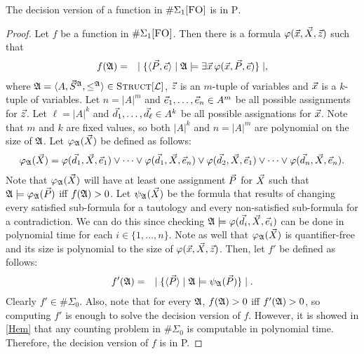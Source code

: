 \begin{theo} \label{decisionptime}
The decision version of a function in $\E1$ is in \textsc{P}.
\end{theo}
\begin{proof}
Let $f$ be a function in $\E1$. Then there is a formula $\varphi(\x,\X,\z)$ such that
\begin{eqnarray*}
f(\A) &=& \mid \{ \langle\P,\e\rangle \mid \A \models \exists \x \, \varphi(\x,\P,\e) \} \mid,
\end{eqnarray*}
where $\A = \langle A, \S^{\A}, \leq^{\A} \rangle \in \Truc$, $\z$ is an $m$-tuple of variables and $\x$ is a $k$-tuple of variables. Let $n = \vert A \vert^m$ and $\e_1,\dots,\e_n \in A^m$ be all possible assignments for $\z$. Let $\ell = \vert A \vert^k$ and $\d_1,\dots,\d_\ell\in A^k$ be all possible assignations for $\x$. Note that $m$ and $k$ are fixed values, so both $\vert A \vert^k$ and $n=\vert A \vert^m$ are polynomial on the size of $\A$. Let $\varphi_\A(\X)$ be defined as follows:
\begin{eqnarray*}
\varphi_\A(\X) = \varphi(\d_1,\X,\e_1) \vee \cdots \vee \varphi(\d_1,\X,\e_n) \vee \varphi(\d_2,\X,\e_1) \vee \cdots \vee \varphi(\d_n,\X,\e_n).
\end{eqnarray*}
Note that $\varphi_\A(\X)$ will have at least one assignment $\P$ for $\X$ such that $\A\models\varphi_\A(\P)$ iff $f(\A)>0$. Let $\psi_\A(\X)$ be the formula that results of changing every satisfied sub-formula for a tautology and every non-satisfied sub-formula for a contradiction. We can do this since checking $\A\models\varphi(\d_i,\X,\e_i)$ can be done in polynomial time for each $i\in\{1,\ldots,n\}$. Note as well that $\varphi_\A(\X)$ is quantifier-free and its size is polynomial to the size of $\varphi(\x,\X,\z)$. Then, let $f'$ be defined as follows:
\begin{eqnarray*}
f'(\A) &=& \mid \{ \langle\P\rangle \mid \A \models \psi_\A(\P) \} \mid.
\end{eqnarray*}
Clearly $f' \in\#\Sigma_0$. Also, note that for every $\A$, $f(\A) > 0$ iff $f'(\A) > 0$, so computing $f'$ is enough to solve the decision version of $f$. However, it is showed in \ref{Hem} that any counting problem in $\#\Sigma_0$ is computable in polynomial time. Therefore, the decision version of $f$ is in {\sc P}.
\end{proof}